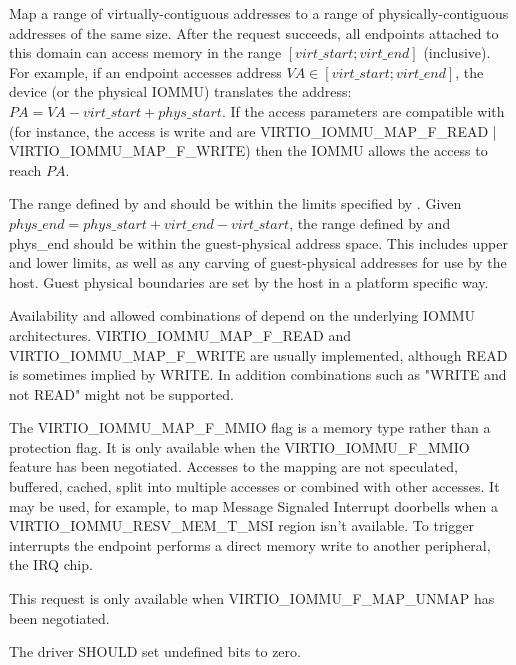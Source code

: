 Map a range of virtually-contiguous addresses to a range of
physically-contiguous addresses of the same size. After the request
succeeds, all endpoints attached to this domain can access memory in the
range $[virt\_start; virt\_end]$ (inclusive). For example, if an endpoint
accesses address $VA \in [virt\_start; virt\_end]$, the device (or the
physical IOMMU) translates the address: $PA = VA - virt\_start +
phys\_start$. If the access parameters are compatible with 
(for instance, the access is write and  are
VIRTIO_IOMMU_MAP_F_READ | VIRTIO_IOMMU_MAP_F_WRITE) then the IOMMU allows
the access to reach $PA$.

The range defined by  and  should be
within the limits specified by . Given $phys\_end =
phys\_start + virt\_end - virt\_start$, the range defined by
 and phys_end should be within the guest-physical
address space. This includes upper and lower limits, as well as any
carving of guest-physical addresses for use by the host. Guest physical
boundaries are set by the host in a platform specific way.

Availability and allowed combinations of  depend on the
underlying IOMMU architectures. VIRTIO_IOMMU_MAP_F_READ and
VIRTIO_IOMMU_MAP_F_WRITE are usually implemented, although READ is
sometimes implied by WRITE. In addition combinations such as "WRITE and
not READ" might not be supported.

The VIRTIO_IOMMU_MAP_F_MMIO flag is a memory type rather than a protection
flag. It is only available when the VIRTIO_IOMMU_F_MMIO feature has been
negotiated. Accesses to the mapping are not speculated, buffered, cached,
split into multiple accesses or combined with other accesses. It may be
used, for example, to map Message Signaled Interrupt doorbells when a
VIRTIO_IOMMU_RESV_MEM_T_MSI region isn't available. To trigger interrupts
the endpoint performs a direct memory write to another peripheral, the IRQ
chip.

This request is only available when VIRTIO_IOMMU_F_MAP_UNMAP has been
negotiated.


The driver SHOULD set undefined  bits to zero.

